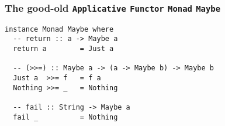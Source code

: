 \begin{frame}[fragile]

\frametitle{The good-old \texttt{Applicative} \texttt{Functor} \texttt{Monad}
\texttt{Maybe}}

\begin{lstlisting}
instance Monad Maybe where
  -- return :: a -> Maybe a
  return a        = Just a

  -- (>>=) :: Maybe a -> (a -> Maybe b) -> Maybe b
  Just a  >>= f   = f a
  Nothing >>= _   = Nothing

  -- fail :: String -> Maybe a
  fail _          = Nothing
\end{lstlisting}

\end{frame}

